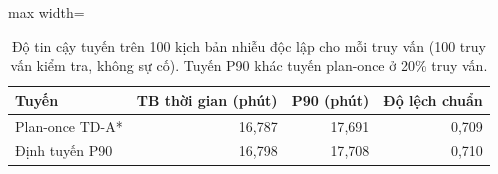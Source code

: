 \begin{table}[!htbp]
\centering
\small
\caption{Độ tin cậy tuyến trên 100 kịch bản nhiễu độc lập cho mỗi truy vấn (100 truy vấn kiểm tra, không sự cố). Tuyến P90 khác tuyến plan-once ở 20\% truy vấn.}
\label{tab:tab_risk}
\begin{adjustbox}{max width=\linewidth}
\begin{tabular}{lrrr}
\toprule
Tuyến & TB thời gian (phút) & P90 (phút) & Độ lệch chuẩn \\
\midrule
Plan-once TD-A* & 16{,}787 & 17{,}691 & 0{,}709 \\
Định tuyến P90 & 16{,}798 & 17{,}708 & 0{,}710 \\
\bottomrule
\end{tabular}
\end{adjustbox}
\end{table}
